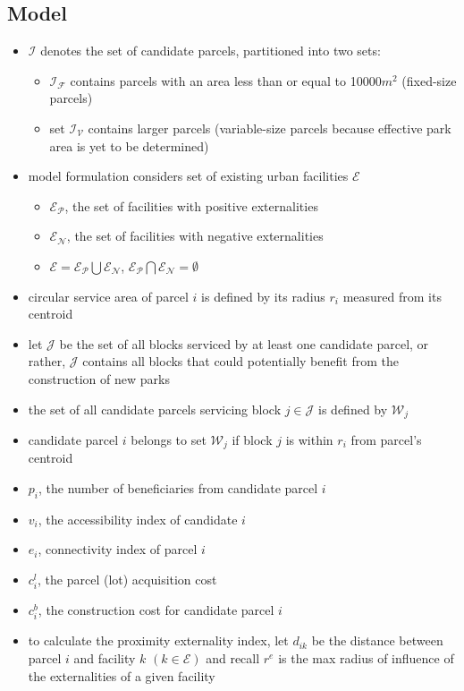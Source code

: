 \documentclass{article}
\begin{document}
\subsection{Model}
\begin{itemize}
\item $\mathcal{I}$ denotes the set of candidate parcels, partitioned into two sets:
	\begin{itemize}
	\item $\mathcal{I_F}$ contains parcels with an area less than or equal to 10000$m^2$ (fixed-size parcels)
	\item set $\mathcal{I_V}$ contains larger parcels (variable-size parcels because effective park area is yet to be determined)
	\end{itemize}
\item model formulation considers set of existing urban facilities $\mathcal{E}$
	\begin{itemize}
	\item $\mathcal{E_P}$, the set of facilities with positive externalities
	\item $\mathcal{E_N}$, the set of facilities with negative externalities
	\item $\mathcal{E} = \mathcal{E_P} \bigcup \mathcal{E_N}$, $\mathcal{E_P} \bigcap \mathcal{E_N} =  \emptyset$
	\end{itemize}
\item circular service area of parcel $i$ is defined by its radius $r_i$ measured from its centroid
\item let $\mathcal{J}$ be the set of all blocks serviced by at least one candidate parcel, or rather, $\mathcal{J}$ contains all blocks that could potentially benefit from the construction of new parks
\item the set of all candidate parcels servicing block $j \in \mathcal{J}$ is defined by $\mathcal{W}_j$
\item candidate parcel $i$ belongs to set $\mathcal{W}_j$ if block $j$ is within $r_i$ from parcel's centroid
\item $p_i$, the number of beneficiaries from candidate parcel $i$
\item $v_i$, the accessibility index of candidate $i$
\item $e_i$, connectivity index of parcel $i$
\item $c_i^l$, the parcel (lot) acquisition cost
\item $c_i^b$, the construction cost for candidate parcel $i$
\item to calculate the proximity externality index, let $d_{ik}$ be the distance between parcel $i$ and facility $k$ $(k \in \mathcal{E})$ and recall $r^e$ is the max radius of influence of the externalities of a given facility

\end{itemize}
\end{document}
